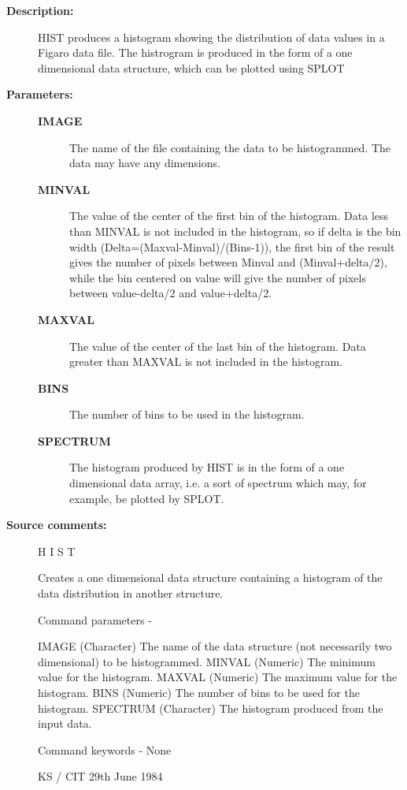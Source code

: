 \begin{description}
\begin{description}
\item [\textbf{Description:}]
 HIST produces a histogram showing the distribution of data values
 in a Figaro data file.  The histrogram is produced in the form of
 a one dimensional data structure, which can be plotted using SPLOT

\item [\textbf{Parameters:}]
\begin{description}
\item [\textbf{IMAGE}]
 The name of the file containing the data to be
 histogrammed.  The data may have any dimensions.
\item [\textbf{MINVAL}]
 The value of the center of the first bin of the
 histogram.  Data less than MINVAL is not included
 in the histogram, so if delta is the bin width
 (Delta=(Maxval-Minval)/(Bins-1)), the first bin
 of the result gives the number of pixels between
 Minval and (Minval+delta/2), while the bin centered
 on value will give the number of pixels between
 value-delta/2 and value+delta/2.
\item [\textbf{MAXVAL}]
 The value of the center of the last bin of the
 histogram.  Data greater than MAXVAL is not
 included in the histogram.
\item [\textbf{BINS}]
 The number of bins to be used in the histogram.
\item [\textbf{SPECTRUM}]
 The histogram produced by HIST is in the form of a
 one dimensional data array, i.e. a sort of spectrum
 which may, for example, be plotted by SPLOT.
\end{description}

\item [\textbf{Source comments:}]
\begin{terminalv}
 H I S T

 Creates a one dimensional data structure containing a histogram
 of the data distribution in another structure.

 Command parameters -

 IMAGE    (Character) The name of the data structure (not necessarily
          two dimensional) to be histogrammed.
 MINVAL   (Numeric) The minimum value for the histogram.
 MAXVAL   (Numeric) The maximum value for the histogram.
 BINS     (Numeric) The number of bins to be used for the histogram.
 SPECTRUM (Character) The histogram produced from the input data.

 Command keywords -  None

                                 KS / CIT 29th June 1984
\end{terminalv}
\end{description}

\end{description}
